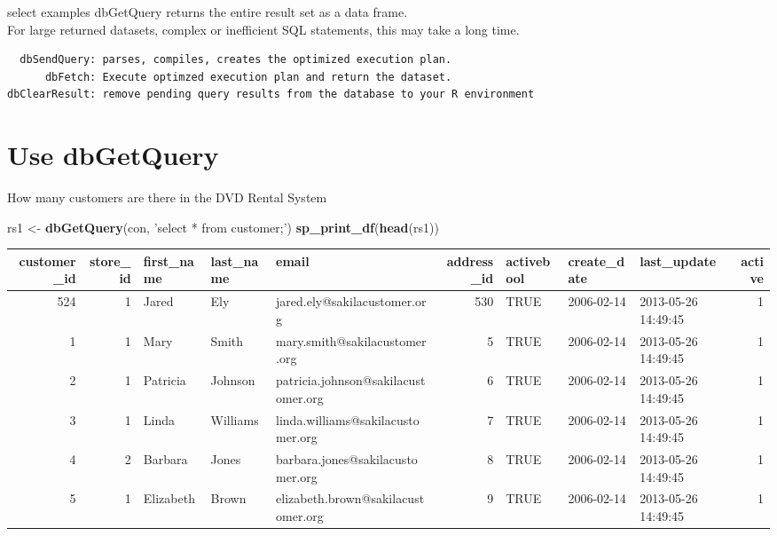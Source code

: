 \documentclass[]{book}
\newenvironment{Shaded}{\begin{snugshade}}{\end{snugshade}}
\newcommand{\KeywordTok}[1]{\textcolor[rgb]{0.13,0.29,0.53}{\textbf{#1}}}
\newcommand{\NormalTok}[1]{#1}
\newcommand{\StringTok}[1]{\textcolor[rgb]{0.31,0.60,0.02}{#1}}
\theoremstyle{definition}
\theoremstyle{definition}
\theoremstyle{definition}
\theoremstyle{remark}
\begin{document}
select examples dbGetQuery returns the entire result set as a data
frame.\\
For large returned datasets, complex or inefficient SQL statements, this
may take a long time.

\begin{verbatim}
  dbSendQuery: parses, compiles, creates the optimized execution plan.  
      dbFetch: Execute optimzed execution plan and return the dataset.
dbClearResult: remove pending query results from the database to your R environment
\end{verbatim}

\hypertarget{use-dbgetquery}{%
\section{Use dbGetQuery}\label{use-dbgetquery}}

How many customers are there in the DVD Rental System

\begin{Shaded}
\begin{Highlighting}[]
\NormalTok{rs1 <-}\StringTok{ }\KeywordTok{dbGetQuery}\NormalTok{(con, }\StringTok{'select * from customer;'}\NormalTok{)}
\KeywordTok{sp_print_df}\NormalTok{(}\KeywordTok{head}\NormalTok{(rs1))}
\end{Highlighting}
\end{Shaded}

\begin{tabular}{r|r|l|l|l|r|l|l|l|r}
\hline
customer\_id & store\_id & first\_name & last\_name & email & address\_id & activebool & create\_date & last\_update & active\\
\hline
524 & 1 & Jared & Ely & jared.ely@sakilacustomer.org & 530 & TRUE & 2006-02-14 & 2013-05-26 14:49:45 & 1\\
\hline
1 & 1 & Mary & Smith & mary.smith@sakilacustomer.org & 5 & TRUE & 2006-02-14 & 2013-05-26 14:49:45 & 1\\
\hline
2 & 1 & Patricia & Johnson & patricia.johnson@sakilacustomer.org & 6 & TRUE & 2006-02-14 & 2013-05-26 14:49:45 & 1\\
\hline
3 & 1 & Linda & Williams & linda.williams@sakilacustomer.org & 7 & TRUE & 2006-02-14 & 2013-05-26 14:49:45 & 1\\
\hline
4 & 2 & Barbara & Jones & barbara.jones@sakilacustomer.org & 8 & TRUE & 2006-02-14 & 2013-05-26 14:49:45 & 1\\
\hline
5 & 1 & Elizabeth & Brown & elizabeth.brown@sakilacustomer.org & 9 & TRUE & 2006-02-14 & 2013-05-26 14:49:45 & 1\\
\hline
\end{tabular}
\end{document}
